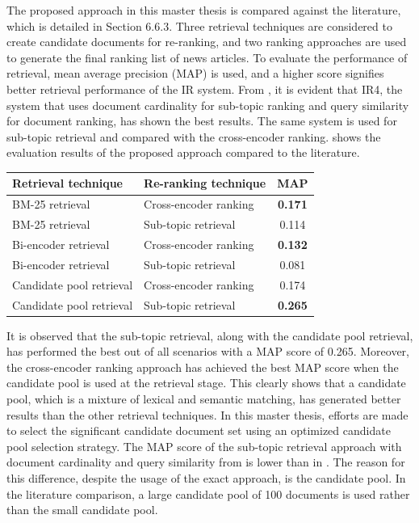 The proposed approach in this master thesis is compared against the literature, which is detailed in Section 6.6.3. Three retrieval techniques are considered to create candidate documents for re-ranking, and two ranking approaches are used to generate the final ranking list of news articles. To evaluate the performance of retrieval, mean average precision (MAP) is used, and a higher score signifies better retrieval performance of the IR system. From , it is evident that IR4, the system that uses document cardinality for sub-topic ranking and query similarity for document ranking, has shown the best results. The same system is used for sub-topic retrieval and compared with the cross-encoder ranking.  shows the evaluation results of the proposed approach compared to the literature.\pagebreak

\begin{center}
	\label{tab:literature_results}
	\begin{tabularx}{0.8\textwidth}{|Y|Y|c|}
		\hline
		Retrieval technique & Re-ranking technique & MAP \\
		\hline
		BM-25 retrieval & Cross-encoder ranking & \textbf{0.171}  \\
		\hline
		BM-25 retrieval  & Sub-topic retrieval & 0.114 \\
		\hline
		\hline
		Bi-encoder retrieval  & Cross-encoder ranking & \textbf{0.132} \\
		\hline
		Bi-encoder retrieval  & Sub-topic retrieval & 0.081 \\
		\hline
		\hline
		Candidate pool retrieval  & Cross-encoder ranking & 0.174 \\
		\hline
		Candidate pool retrieval & Sub-topic retrieval &  \textbf{0.265} \\
		\hline
	\end{tabularx}
\end{center}


It is observed that the sub-topic retrieval, along with the candidate pool retrieval, has performed the best out of all scenarios with a \ac{MAP} score of 0.265. Moreover, the cross-encoder ranking approach has achieved the best \ac{MAP} score when the candidate pool is used at the retrieval stage. This clearly shows that a candidate pool, which is a mixture of lexical and semantic matching, has generated better results than the other retrieval techniques. In this master thesis, efforts are made to select the significant candidate document set using an optimized candidate pool selection strategy. The \ac{MAP} score of the sub-topic retrieval approach with document cardinality and query similarity from  is lower than in . The reason for this difference, despite the usage of the exact approach, is the candidate pool. In the literature comparison, a large candidate pool of 100 documents is used rather than the small candidate pool.

